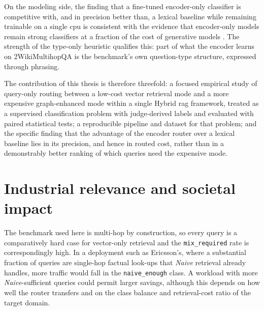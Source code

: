 \documentclass[english, bibtex]{kththesis}               %
\numberwithin{listing}{chapter}
\begin{document}
On the modeling side, the finding that a fine-tuned encoder-only classifier is competitive with, and in precision better than, a lexical baseline while remaining trainable on a single \gls{cpu} is consistent with the evidence that encoder-only models remain strong classifiers at a fraction of the cost of generative models \cite{benayas2024encoder,warner2024modernbert}. The strength of the type-only heuristic qualifies this: part of what the encoder learns on 2WikiMultihopQA is the benchmark's own question-type structure, expressed through phrasing.

The contribution of this thesis is therefore threefold: a focused empirical study of query-only routing between a low-cost vector retrieval mode and a more expensive graph-enhanced mode within a single Hybrid \gls{rag} framework, treated as a supervised classification problem with judge-derived labels and evaluated with paired statistical tests; a reproducible pipeline and dataset for that problem; and the specific finding that the advantage of the encoder router over a lexical baseline lies in its precision, and hence in routed cost, rather than in a demonstrably better ranking of which queries need the expensive mode.

\section{Industrial relevance and societal impact}
\label{sec:discIndustrial}

The benchmark used here is multi-hop by construction, so every query is a comparatively hard case for vector-only retrieval and the \texttt{mix\_required} rate is correspondingly high. In a deployment such as Ericsson's, where a substantial fraction of queries are single-hop factual look-ups that \emph{Naive} retrieval already handles, more traffic would fall in the \texttt{naive\_enough} class. A workload with more \emph{Naive}-sufficient queries could permit larger savings, although this depends on how well the router transfers and on the class balance and retrieval-cost ratio of the target domain.
\end{document}
